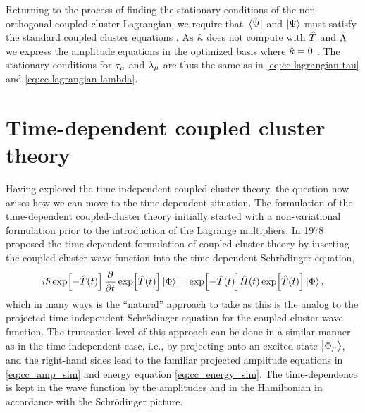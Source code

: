             Returning to the process of finding the stationary conditions of the
            non-orthogonal coupled-cluster Lagrangian, we require that
            $\bra*{\tilde{\Psi}}$ and $\ket{\Psi}$ must satisfy the standard
            coupled cluster equations \cite{rolf-nocc}.
            As $\hat{\kappa}$ does not compute with $\hat{T}$ and $\hat{\Lambda}$ we express
            the amplitude equations in the optimized basis where $\hat{\kappa} = 0$
            \cite{rolf-nocc}.
            The stationary conditions for $\tau_{\mu}$ and
            $\lambda_{\mu}$ are thus the same as in
            \autoref{eq:cc-lagrangian-tau} and
            \autoref{eq:cc-lagrangian-lambda}.

    \section{Time-dependent coupled cluster theory}
        Having explored the time-independent coupled-cluster theory, the
        question now arises how we can move to the time-dependent situation.
        The formulation of the time-dependent coupled-cluster theory initially
        started with a non-variational formulation prior to the introduction of
        the Lagrange multipliers.
        In 1978 \citeauthor{tdcc-hoodbhoy} \cite{tdcc-hoodbhoy, tdcc-hoodbhoy-2}
        proposed the time-dependent formulation of coupled-cluster theory by
        inserting the coupled-cluster wave function into the time-dependent
        Schrödinger equation,
        \begin{align}
            i\hslash
            \exp[-\clust(t)]\dpd{}{t}\exp[\clust(t)]\ket{\slat}
            = \exp[-\clust(t)]\hamil(t)\exp[\clust(t)]\ket{\slat},
        \end{align}
        which in many ways is the ``natural'' approach to take as this is the
        analog to the projected time-independent Schrödinger equation for the
        coupled-cluster wave function.
        The truncation level of this approach can be done in a similar manner as
        in the time-independent case, i.e., by projecting onto an excited state
        $\ket{\Phi_{\mu}}$, and the right-hand sides lead to the familiar
        projected amplitude equations in \autoref{eq:cc_amp_sim} and energy
        equation \autoref{eq:cc_energy_sim}.
        The time-dependence is kept in the wave function by the amplitudes and
        in the Hamiltonian in accordance with the Schrödinger picture.

